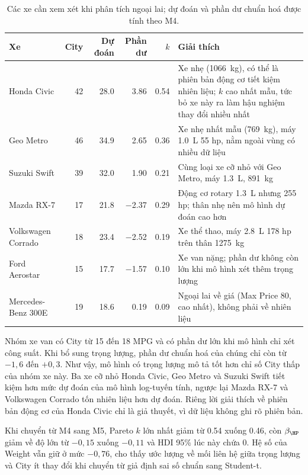 \documentclass[12pt,a4paper]{report}
\begin{document}
\begin{table}[tp]
  \centering
  \small
  \caption{Các xe cần xem xét khi phân tích ngoại lai; dự đoán và phần dư chuẩn
    hoá được tính theo M4.}
  \label{tab:outliers}
  \begin{tabular}{lrrrr>{\raggedright\arraybackslash}p{6.4cm}}
    \toprule
    Xe & City & Dự đoán & Phần dư & $k$ & Giải thích \\
    \midrule
    Honda Civic        & 42 & \num{28.0} & \num{3.86}  & \num{0.54}
      & Xe nhẹ (\SI{1066}{kg}), có thể là phiên bản động cơ tiết kiệm nhiên liệu; $k$ cao nhất mẫu, tức bỏ xe này ra làm hậu nghiệm thay đổi nhiều nhất \\
    Geo Metro          & 46 & \num{34.9} & \num{2.65}  & \num{0.36}
      & Xe nhẹ nhất mẫu (\SI{769}{kg}), máy \SI{1.0}{L} 55 hp, nằm ngoài vùng có nhiều dữ liệu \\
    Suzuki Swift       & 39 & \num{32.0} & \num{1.90}  & \num{0.21}
      & Cùng loại xe cỡ nhỏ với Geo Metro, máy \SI{1.3}{L}, \SI{891}{kg} \\
    Mazda RX-7         & 17 & \num{21.8} & \num{-2.37} & \num{0.29}
      & Động cơ rotary \SI{1.3}{L} nhưng 255 hp; thân nhẹ nên mô hình dự đoán cao hơn \\
    Volkswagen Corrado & 18 & \num{23.4} & \num{-2.52} & \num{0.19}
      & Xe thể thao, máy \SI{2.8}{L} 178 hp trên thân \SI{1275}{kg} \\
    Ford Aerostar      & 15 & \num{17.7} & \num{-1.57} & \num{0.10}
      & Xe van nặng; phần dư không còn lớn khi mô hình xét thêm trọng lượng \\
    Mercedes-Benz 300E & 19 & \num{18.6} & \num{0.19}  & \num{0.09}
      & Ngoại lai về giá (Max Price 80, cao nhất), không phải về nhiên liệu \\
    \bottomrule
  \end{tabular}
\end{table}

Nhóm xe van có City từ 15 đến 18 MPG và có phần dư lớn khi mô hình chỉ xét công
suất. Khi bổ sung trọng lượng, phần dư chuẩn hoá của chúng chỉ còn từ
$-1{,}6$ đến $+0{,}3$. Như vậy, mô hình có trọng lượng mô tả tốt hơn chỉ số
City thấp của nhóm xe này. Ba xe cỡ
nhỏ Honda Civic, Geo Metro và Suzuki Swift tiết kiệm hơn mức dự đoán của mô hình
log-tuyến tính, ngược lại Mazda RX-7 và Volkswagen Corrado tốn nhiên liệu hơn dự
đoán. Riêng lời giải thích về phiên bản động cơ của Honda Civic chỉ là giả
thuyết, vì dữ liệu không ghi rõ phiên bản.

Khi chuyển từ M4 sang M5, Pareto $k$ lớn nhất giảm từ
\num{0.54} xuống \num{0.46}, còn $\beta_{\HP}$ giảm về độ lớn từ $-0{,}15$ xuống
$-0{,}11$ và HDI 95\% lúc này chứa 0. Hệ số của Weight vẫn giữ ở mức $-0{,}76$,
cho thấy ước lượng về mối liên hệ giữa trọng lượng và City ít thay đổi khi
chuyển từ giả định sai số chuẩn sang Student-t.
\end{document}
